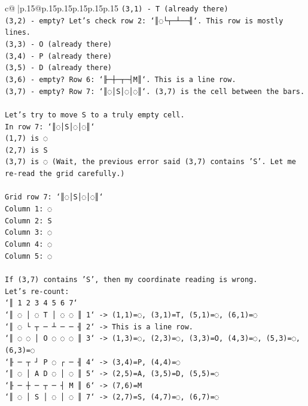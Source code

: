 \documentclass{article}
\begin{document}
{\begin{supertabular}{c@{$\;$}|p{.15\linewidth}@{}p{.15\linewidth}p{.15\linewidth}p{.15\linewidth}p{.15\linewidth}p{.15\linewidth}}
{{{\texttt{(3,1) {-} T (already there)} \\
\texttt{(3,2) {-} empty? Let's check row 2: `║◌└┬─┴──╢`. This row is mostly lines.} \\
\texttt{(3,3) {-} O (already there)} \\
\texttt{(3,4) {-} P (already there)} \\
\texttt{(3,5) {-} D (already there)} \\
\texttt{(3,6) {-} empty? Row 6: `╟─┼─┬─┤M║`. This is a line row.} \\
\texttt{(3,7) {-} empty? Row 7: `║◌│S│◌│◌║`. (3,7) is the cell between the bars.} \\
\\ 
\texttt{Let's try to move S to a truly empty cell.} \\
\texttt{In row 7: `║◌│S│◌│◌║`} \\
\texttt{(1,7) is ◌} \\
\texttt{(2,7) is S} \\
\texttt{(3,7) is ◌ (Wait, the previous error said (3,7) contains 'S'. Let me re{-}read the grid carefully.)} \\
\\ 
\texttt{Grid row 7: `║◌│S│◌│◌║`} \\
\texttt{Column 1: ◌} \\
\texttt{Column 2: S} \\
\texttt{Column 3: ◌} \\
\texttt{Column 4: ◌} \\
\texttt{Column 5: ◌} \\
\\ 
\texttt{If (3,7) contains 'S', then my coordinate reading is wrong.} \\
\texttt{Let's re{-}count:} \\
\texttt{`║ 1 2 3 4 5 6 7`} \\
\texttt{`║ ◌ │ ◌ T │ ◌ ◌ ║ 1` {-}> (1,1)=◌, (3,1)=T, (5,1)=◌, (6,1)=◌} \\
\texttt{`║ ◌ └ ┬ ─ ┴ ─ ─ ╢ 2` {-}> This is a line row.} \\
\texttt{`║ ◌ ◌ │ O ◌ ◌ ◌ ║ 3` {-}> (1,3)=◌, (2,3)=◌, (3,3)=O, (4,3)=◌, (5,3)=◌, (6,3)=◌} \\
\texttt{`╟ ─ ┬ ┘ P ◌ ┌ ─ ╢ 4` {-}> (3,4)=P, (4,4)=◌} \\
\texttt{`║ ◌ │ A D ◌ │ ◌ ║ 5` {-}> (2,5)=A, (3,5)=D, (5,5)=◌} \\
\texttt{`╟ ─ ┼ ─ ┬ ─ ┤ M ║ 6` {-}> (7,6)=M} \\
\texttt{`║ ◌ │ S │ ◌ │ ◌ ║ 7` {-}> (2,7)=S, (4,7)=◌, (6,7)=◌} \\
}}}
\end{supertabular}}
\end{document}
